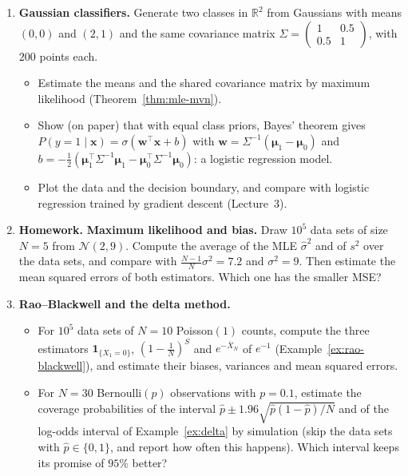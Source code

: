 \documentclass[11pt]{article}
\newcommand{\homework}{\textcolor{red!70!black}{\textbf{Homework.}}}
\theoremstyle{definition}
\theoremstyle{plain}
\theoremstyle{remark}
\begin{document}
\begin{enumerate}[label=\textbf{P\arabic*.}, leftmargin=*]
    \item \textbf{Gaussian classifiers.} Generate two classes in $\mathbb{R}^2$ from Gaussians with means $(0, 0)$ and $(2, 1)$ and the same covariance matrix $\Sigma = \begin{pmatrix} 1 & 0.5 \\ 0.5 & 1 \end{pmatrix}$, with $200$ points each.
    \begin{itemize}
        \item Estimate the means and the shared covariance matrix by maximum likelihood (Theorem~\ref{thm:mle-mvn}).
        \item Show (on paper) that with equal class priors, Bayes' theorem gives $P(y = 1 \mid \mathbf{x}) = \sigma(\mathbf{w}^\top\mathbf{x} + b)$ with $\mathbf{w} = \Sigma^{-1}(\boldsymbol{\mu}_1 - \boldsymbol{\mu}_0)$ and $b = -\frac{1}{2}(\boldsymbol{\mu}_1^\top\Sigma^{-1}\boldsymbol{\mu}_1 - \boldsymbol{\mu}_0^\top\Sigma^{-1}\boldsymbol{\mu}_0)$: a logistic regression model.
        \item Plot the data and the decision boundary, and compare with logistic regression trained by gradient descent (Lecture~3).
    \end{itemize}

    \item \homework{} \textbf{Maximum likelihood and bias.} Draw $10^5$ data sets of size $N = 5$ from $\mathcal{N}(2, 9)$. Compute the average of the MLE $\hat\sigma^2$ and of $s^2$ over the data sets, and compare with $\frac{N - 1}{N}\sigma^2 = 7.2$ and $\sigma^2 = 9$. Then estimate the mean squared errors of both estimators. Which one has the smaller MSE?

    \item \textbf{Rao--Blackwell and the delta method.}
    \begin{itemize}
        \item For $10^5$ data sets of $N = 10$ Poisson$(1)$ counts, compute the three estimators $\mathbf{1}_{\{X_1 = 0\}}$, $(1 - \frac{1}{N})^S$ and $e^{-\bar X_N}$ of $e^{-1}$ (Example~\ref{ex:rao-blackwell}), and estimate their biases, variances and mean squared errors.
        \item For $N = 30$ Bernoulli$(p)$ observations with $p = 0.1$, estimate the coverage probabilities of the interval $\hat p \pm 1.96\sqrt{\hat p(1 - \hat p)/N}$ and of the log-odds interval of Example~\ref{ex:delta} by simulation (skip the data sets with $\hat p \in \{0, 1\}$, and report how often this happens). Which interval keeps its promise of $95\%$ better?
    \end{itemize}


\end{enumerate}
\end{document}
